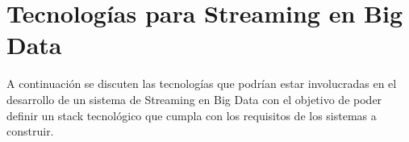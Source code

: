 \section{Tecnologías para Streaming en Big Data}

A continuación se discuten las tecnologías que podrían estar involucradas en el desarrollo de un sistema
de Streaming en Big Data con el objetivo de poder definir un stack tecnológico que cumpla con los 
requisitos de los sistemas a construir. \newline





